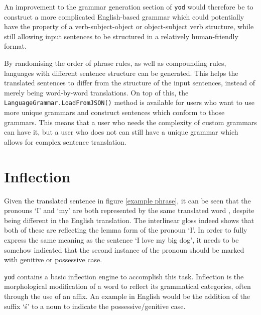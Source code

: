 \documentclass{report}
\begin{document}
	An improvement to the grammar generation section of \texttt{yod} would therefore be to construct a more complicated English-based grammar which could potentially have the property of a verb-subject-object or object-subject verb structure, while still allowing input sentences to be structured in a relatively human-friendly format.
	
	By randomising the order of phrase rules, as well as compounding rules, languages with different sentence structure can be generated. This helps the translated sentences to differ from the structure of the input sentences, instead of merely being word-by-word translations. On top of this, the \texttt{LanguageGrammar.\-LoadFromJSON()} method is available for users who want to use more unique grammars and construct sentences which conform to those grammars. This means that a user who needs the complexity of custom grammars can have it, but a user who does not can still have a unique grammar which allows for complex sentence translation.
	
	\section{Inflection}
	\label{section: inflection}
	
	Given the translated sentence in figure \ref{example phrase}, it can be seen that the pronouns `I' and `my' are both represented by the same translated word \textit{\dj{}}, despite being different in the English translation. The interlinear gloss indeed shows that both of these are reflecting the lemma form of the pronoun `I'. In order to fully express the same meaning as the sentence `I love my big dog', it needs to be somehow indicated that the second instance of the pronoun should be marked with genitive or possessive case.
	
	\texttt{yod} contains a basic inflection engine to accomplish this task. Inflection is the morphological modification of a word to reflect its grammatical categories\cite{crystal2011dictionary}, often through the use of an affix. An example in English would be the addition of the suffix `\'s' to a noun to indicate the possessive/genitive case.
   
   \printbibliography
\end{document}

